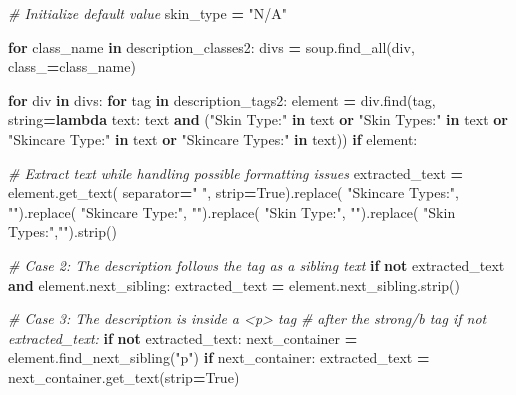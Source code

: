 \documentclass[
]{article}
\newenvironment{Shaded}{\begin{snugshade}}{\end{snugshade}}
\newcommand{\CommentTok}[1]{\textcolor[rgb]{0.56,0.35,0.01}{\textit{#1}}}
\newcommand{\ControlFlowTok}[1]{\textcolor[rgb]{0.13,0.29,0.53}{\textbf{#1}}}
\newcommand{\KeywordTok}[1]{\textcolor[rgb]{0.13,0.29,0.53}{\textbf{#1}}}
\newcommand{\NormalTok}[1]{#1}
\newcommand{\OperatorTok}[1]{\textcolor[rgb]{0.81,0.36,0.00}{\textbf{#1}}}
\newcommand{\StringTok}[1]{\textcolor[rgb]{0.31,0.60,0.02}{#1}}
\newcommand{\VariableTok}[1]{\textcolor[rgb]{0.00,0.00,0.00}{#1}}
\begin{document}
\begin{Shaded}
\begin{Highlighting}[]
        \CommentTok{\# Initialize default value}
\NormalTok{        skin\_type }\OperatorTok{=} \StringTok{"N/A"}

        \ControlFlowTok{for}\NormalTok{ class\_name }\KeywordTok{in}\NormalTok{ description\_classes2:}
\NormalTok{          divs }\OperatorTok{=}\NormalTok{ soup.find\_all(}\StringTok{\textquotesingle{}div\textquotesingle{}}\NormalTok{, class\_}\OperatorTok{=}\NormalTok{class\_name)}

          \ControlFlowTok{for}\NormalTok{ div }\KeywordTok{in}\NormalTok{ divs:}
            \ControlFlowTok{for}\NormalTok{ tag }\KeywordTok{in}\NormalTok{ description\_tags2:}
\NormalTok{              element }\OperatorTok{=}\NormalTok{ div.find(tag, string}\OperatorTok{=}\KeywordTok{lambda}\NormalTok{ text: text }\KeywordTok{and} 
\NormalTok{              (}\StringTok{"Skin Type:"} \KeywordTok{in}\NormalTok{ text }\KeywordTok{or} \StringTok{"Skin Types:"} 
              \KeywordTok{in}\NormalTok{ text }\KeywordTok{or} \StringTok{"Skincare Type:"} \KeywordTok{in}\NormalTok{ text }\KeywordTok{or} \StringTok{"Skincare Types:"} \KeywordTok{in}\NormalTok{ text))}
              \ControlFlowTok{if}\NormalTok{ element: }

                \CommentTok{\# Extract text while handling possible formatting issues}
\NormalTok{                extracted\_text }\OperatorTok{=}\NormalTok{ element.get\_text(}
\NormalTok{                  separator}\OperatorTok{=}\StringTok{" "}\NormalTok{, strip}\OperatorTok{=}\VariableTok{True}\NormalTok{).replace(}
                    \StringTok{"Skincare Types:"}\NormalTok{, }\StringTok{""}\NormalTok{).replace(}
                      \StringTok{"Skincare Type:"}\NormalTok{, }\StringTok{""}\NormalTok{).replace(}
                        \StringTok{"Skin Type:"}\NormalTok{, }\StringTok{""}\NormalTok{).replace(}
                          \StringTok{"Skin Types:"}\NormalTok{,}\StringTok{""}\NormalTok{).strip()}

                \CommentTok{\# Case 2: The description follows the tag as a sibling text}
                \ControlFlowTok{if} \KeywordTok{not}\NormalTok{ extracted\_text }\KeywordTok{and}\NormalTok{ element.next\_sibling:}
\NormalTok{                  extracted\_text }\OperatorTok{=}\NormalTok{ element.next\_sibling.strip()}
    
                \CommentTok{\# Case 3: The description is inside a \textasciigrave{}\textless{}p\textgreater{}\textasciigrave{} tag}
                \CommentTok{\# after the strong/b tag if not extracted\_text:}
                \ControlFlowTok{if} \KeywordTok{not}\NormalTok{ extracted\_text:}
\NormalTok{                  next\_container }\OperatorTok{=}\NormalTok{ element.find\_next\_sibling(}\StringTok{"p"}\NormalTok{)}
                  \ControlFlowTok{if}\NormalTok{ next\_container:}
\NormalTok{                    extracted\_text }\OperatorTok{=}\NormalTok{ next\_container.get\_text(strip}\OperatorTok{=}\VariableTok{True}\NormalTok{)}
                    

\end{Highlighting}
\end{Shaded}
\end{document}
